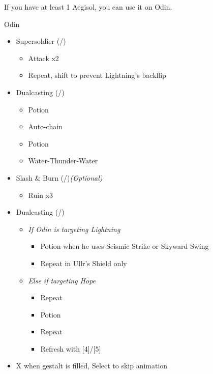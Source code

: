 \begin{multicols}{2}
\renewcommand{\first}{[1] Slash \& Burn (\com/\rav)}
\renewcommand{\second}{[2] Supersoldier (\com/\syn)}
\renewcommand{\fourth}{[4] Dualcasting (\rav/\rav)}
\renewcommand{\fifth}{[5] Dualcasting (\rav/\rav)}
If you have at least 1 Aegisol, you can use it on Odin.
\begin{battle}{Odin}
\begin{itemize}
    \item \second
    \begin{itemize}
        \item Attack x2
        \item Repeat, shift to prevent Lightning's backflip
    \end{itemize}
    \item \fourth
    \begin{itemize}
        \item Potion
        \item Auto-chain
        \item Potion
        \item Water-Thunder-Water
    \end{itemize}
	\item \first \textit{(Optional)}
	\begin{itemize}
		\item Ruin x3
	\end{itemize}
    \columnbreak
    \item \fifth
    \begin{itemize}
        \item \textit{If Odin is targeting Lightning}
        \begin{itemize}
            \item Potion when he uses Seismic Strike or Skyward Swing
            \item Repeat in Ullr's Shield only
        \end{itemize}
        \item \textit{Else if targeting Hope}
        \begin{itemize}
            \item Repeat
            \item Potion
            \item Repeat
            \item Refresh with [4]/[5]
        \end{itemize}
    \end{itemize}
    \item X when gestalt is filled, Select to skip animation
\end{itemize}

\end{battle}
\end{multicols}
